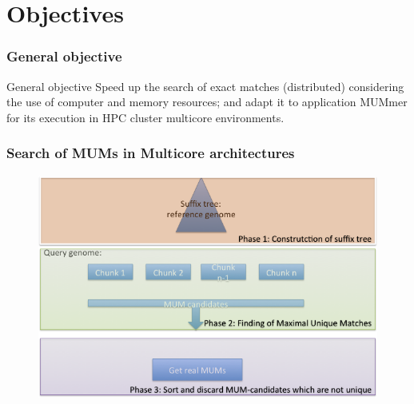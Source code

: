 \documentclass{beamer}
\begin{document}
\section{Objectives}
\begin{frame}
 \frametitle{General objective}
 \begin{block}{General objective}
Speed up the search of exact matches (distributed) considering the use of computer and memory resources; and adapt it to application MUMmer for its execution in HPC cluster multicore environments.
\end{block}
\end{frame}
\begin{frame}
  \frametitle{Search of MUMs in Multicore architectures}
  \begin{figure}
    \includegraphics[scale=0.45]{Phases.png}
  \end{figure}
\end{frame}
\end{document}
